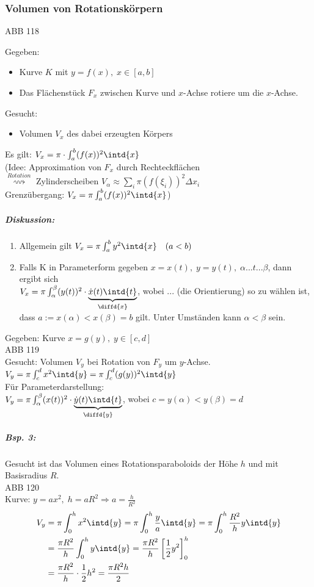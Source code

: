 \subsubsection{Volumen von Rotationskörpern}
ABB 118
\begin{anumerate}
\item Gegeben:
\begin{itemize}
\item Kurve $K$ mit $y=f(x), \; x \in [a,b]$
\item Das Flächenstück $F_x$ zwischen Kurve und $x$-Achse rotiere um die $x$-Achse.
\end{itemize}
Gesucht:
\begin{itemize}
\item Volumen $V_x$ des dabei erzeugten Körpers
\end{itemize}
Es gilt: $V_x = \pi \cdot \int_a^b(f(x))^2\intd{x}$\\
(Idee: Approximation von $F_x$ durch Rechteckflächen \\
$\overset{Rotation}{\rightsquigarrow}$ Zylinderscheiben $V_{\alpha}\approx \sum_i \pi (f(\xi_i))^2\Delta x_i$\\
Grenzübergang: $V_x=\pi \int_a^b (f(x))^2\intd{x}$)
\subparagraph{Diskussion:}
\begin{enumerate}
\item Allgemein gilt $V_x=\pi \int_a^b y^2\intd{x} \quad (a<b)$
\item Falls K in Parameterform gegeben $x=x(t),\; y=y(t), \; \alpha ... t ... \beta$, dann ergibt sich \\
$V_x=\pi \int_{\alpha}^{\beta} (y(t))^2\cdot \underbrace{\dot{x}(t) \intd{t}}_{\diffd{x}}$, wobei $...$ (die Orientierung) so zu wählen ist, dass $a:= x(\alpha) < x(\beta) = b$ gilt. Unter Umständen kann $\alpha<\beta$ sein.
\end{enumerate}
\item Gegeben: Kurve $x=g(y), \; y\in [c,d]$\\
ABB 119\\
Gesucht: Volumen $V_y$ bei Rotation von $F_y$ um $y$-Achse.\\
$V_y=\pi \int_c^d x^2\intd{y} = \pi \int_c^d (g(y))^2\intd{y}$\\
Für Parameterdarstellung:\\
$V_y=\pi \int_{\alpha}^{\beta}(x(t))^2\cdot \underbrace{\dot{y}(t) \intd{t}}_{\diffd{y}}$, wobei $c=y(\alpha)<y(\beta)=d$
\subparagraph{Bsp. 3:} Gesucht ist das Volumen eines Rotationsparaboloids der Höhe $h$ und mit Basisradius $R$.\\
ABB 120\\
Kurve: $y=ax^2, \; h=aR^2 \Rightarrow a =\frac{h}{R^2}$
\begin{align*}
V_y&=\pi\int_0^h x^2\intd{y}=\pi\int_0^h \frac{y}{a}\intd{y} = \pi\int_0^h \frac{R^2}{h}y  \intd{y}\\
&= \frac{\pi R^2}{h}\int_0^h y \intd{y}=\frac{\pi R^2}{h}\left[\frac{1}{2}y^2\right]_0^h\\
&= \frac{\pi R^2}{h}\cdot \frac{1}{2}h^2=\frac{\pi R^2 h}{2}
\end{align*}
\end{anumerate}

